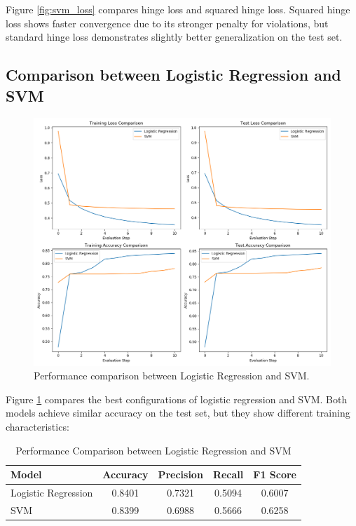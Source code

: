 \documentclass[journal, a4paper]{IEEEtran}
\begin{document}
Figure \ref{fig:svm_loss} compares hinge loss and squared hinge loss. Squared hinge loss shows faster convergence due to its stronger penalty for violations, but standard hinge loss demonstrates slightly better generalization on the test set.

\subsection{Comparison between Logistic Regression and SVM}

\begin{figure}[htbp]
\centering
\includegraphics[width=\linewidth]{lr_vs_svm_comparison.png}
\caption{Performance comparison between Logistic Regression and SVM.}
\label{fig:lr_vs_svm}
\end{figure}

Figure \ref{fig:lr_vs_svm} compares the best configurations of logistic regression and SVM. Both models achieve similar accuracy on the test set, but they show different training characteristics:

\begin{table}[htbp]
\centering
\caption{Performance Comparison between Logistic Regression and SVM}
\label{tab:comparison}
\begin{tabular}{lcccc}
\toprule
\textbf{Model} & \textbf{Accuracy} & \textbf{Precision} & \textbf{Recall} & \textbf{F1 Score} \\
\midrule
Logistic Regression & 0.8401 & 0.7321 & 0.5094 & 0.6007 \\
SVM & 0.8399 & 0.6988 & 0.5666 & 0.6258 \\
\bottomrule
\end{tabular}
\end{table}
\end{document}
